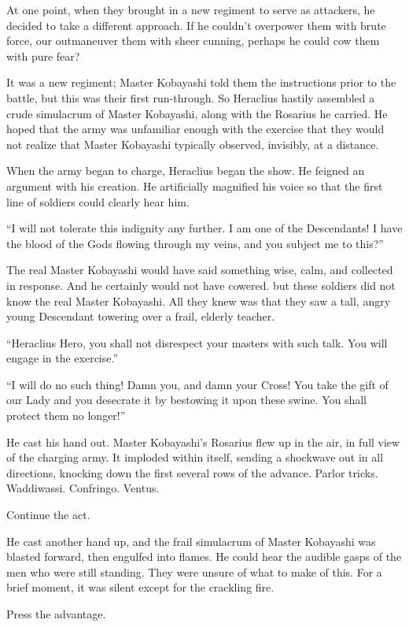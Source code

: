 At one point, when they brought in a new regiment to serve as attackers, he decided to take a different approach. If he couldn’t overpower them with brute force, our outmaneuver them with sheer cunning, perhaps he could cow them with pure fear?

It was a new regiment; Master Kobayashi told them the instructions prior to the battle, but this was their first run-through. So Heraclius hastily assembled a crude simulacrum of Master Kobayashi, along with the Rosarius he carried. He hoped that the army was unfamiliar enough with the exercise that they would not realize that Master Kobayashi typically observed, invisibly, at a distance.

When the army began to charge, Heraclius began the show. He feigned an argument with his creation. He artificially magnified his voice so that the first line of soldiers could clearly hear him.

“I will not tolerate this indignity any further. I am one of the Descendants! I have the blood of the Gods flowing through my veins, and you subject me to this?”

The real Master Kobayashi would have said something wise, calm, and collected in response. And he certainly would not have cowered. but these soldiers did not know the real Master Kobayashi. All they knew was that they saw a tall, angry young Descendant towering over a frail, elderly teacher.

“Heraclius Hero, you shall not disrespect your masters with such talk. You will engage in the exercise.”

“I will do no such thing! Damn you, and damn your Cross! You take the gift of our Lady and you desecrate it by bestowing it upon these swine. You shall protect them no longer!”

He cast his hand out. Master Kobayashi’s Rosarius flew up in the air, in full view of the charging army. It imploded within itself, sending a shockwave out in all directions, knocking down the first several rows of the advance. Parlor tricks. Waddiwassi. Confringo. Ventus.

Continue the act.

He cast another hand up, and the frail simulacrum of Master Kobayashi was blasted forward, then engulfed into flames. He could hear the audible gasps of the men who were still standing. They were unsure of what to make of this. For a brief moment, it was silent except for the crackling fire.

Press the advantage.

